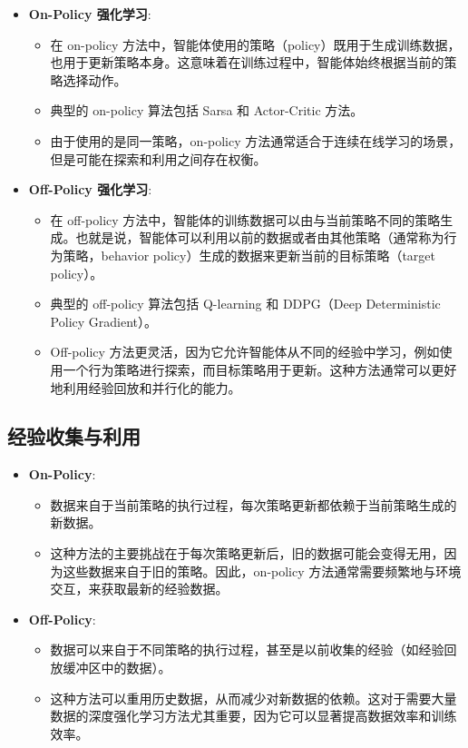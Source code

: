 \documentclass[twocolumn, 10pt]{article} %
\theoremstyle{remark}
\begin{document}
\begin{itemize}
    \item \textbf{On-Policy 强化学习}:
    \begin{itemize}
        \item 在 on-policy 方法中，智能体使用的策略（policy）既用于生成训练数据，也用于更新策略本身。这意味着在训练过程中，智能体始终根据当前的策略选择动作。
        \item 典型的 on-policy 算法包括 Sarsa 和 Actor-Critic 方法。
        \item 由于使用的是同一策略，on-policy 方法通常适合于连续在线学习的场景，但是可能在探索和利用之间存在权衡。
    \end{itemize}
    
    \item \textbf{Off-Policy 强化学习}:
    \begin{itemize}
        \item 在 off-policy 方法中，智能体的训练数据可以由与当前策略不同的策略生成。也就是说，智能体可以利用以前的数据或者由其他策略（通常称为行为策略，behavior policy）生成的数据来更新当前的目标策略（target policy）。
        \item 典型的 off-policy 算法包括 Q-learning 和 DDPG（Deep Deterministic Policy Gradient）。
        \item Off-policy 方法更灵活，因为它允许智能体从不同的经验中学习，例如使用一个行为策略进行探索，而目标策略用于更新。这种方法通常可以更好地利用经验回放和并行化的能力。
    \end{itemize}
\end{itemize}

\subsection{经验收集与利用}

\begin{itemize}
    \item \textbf{On-Policy}:
    \begin{itemize}
        \item 数据来自于当前策略的执行过程，每次策略更新都依赖于当前策略生成的新数据。
        \item 这种方法的主要挑战在于每次策略更新后，旧的数据可能会变得无用，因为这些数据来自于旧的策略。因此，on-policy 方法通常需要频繁地与环境交互，来获取最新的经验数据。
    \end{itemize}
    
    \item \textbf{Off-Policy}:
    \begin{itemize}
        \item 数据可以来自于不同策略的执行过程，甚至是以前收集的经验（如经验回放缓冲区中的数据）。
        \item 这种方法可以重用历史数据，从而减少对新数据的依赖。这对于需要大量数据的深度强化学习方法尤其重要，因为它可以显著提高数据效率和训练效率。
    \end{itemize}
\end{itemize}
\end{document}

